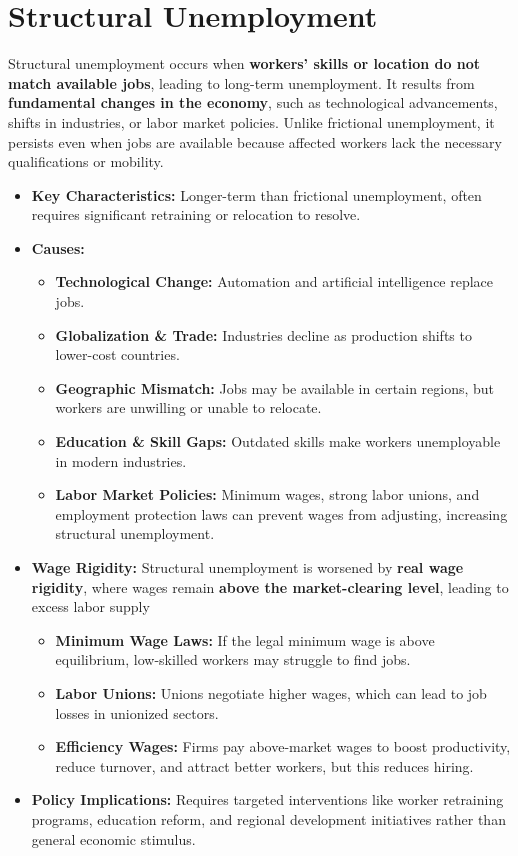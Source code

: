 \documentclass[a4paper, 11pt]{article}
\begin{document}
\section{Structural Unemployment}
Structural unemployment occurs when \textbf{workers’ skills or location do not match available jobs}, leading to long-term unemployment. It results from \textbf{fundamental changes in the economy}, such as technological advancements, shifts in industries, or labor market policies. Unlike frictional unemployment, it persists even when jobs are available because affected workers lack the necessary qualifications or mobility.
\begin{itemize}
    \item \textbf{Key Characteristics:} Longer-term than frictional unemployment, often requires significant retraining or relocation to resolve.
    \item \textbf{Causes:}
    \begin{itemize}
        \item \textbf{Technological Change:} Automation and artificial intelligence replace jobs.
        \item \textbf{Globalization \& Trade:} Industries decline as production shifts to lower-cost countries.
        \item \textbf{Geographic Mismatch:} Jobs may be available in certain regions, but workers are unwilling or unable to relocate.
        \item \textbf{Education \& Skill Gaps:} Outdated skills make workers unemployable in modern industries.
        \item \textbf{Labor Market Policies:} Minimum wages, strong labor unions, and employment protection laws can prevent wages from adjusting, increasing structural unemployment.
    \end{itemize}
    \item \textbf{Wage Rigidity:} Structural unemployment is worsened by \textbf{real wage rigidity}, where wages remain \textbf{above the market-clearing level}, leading to excess labor supply
    \begin{itemize}
        \item \textbf{Minimum Wage Laws:} If the legal minimum wage is above equilibrium, low-skilled workers may struggle to find jobs.
        \item \textbf{Labor Unions:} Unions negotiate higher wages, which can lead to job losses in unionized sectors.
        \item \textbf{Efficiency Wages:} Firms pay above-market wages to boost productivity, reduce turnover, and attract better workers, but this reduces hiring.
    \end{itemize}
    \item \textbf{Policy Implications:} Requires targeted interventions like worker retraining programs, education reform, and regional development initiatives rather than general economic stimulus.
\end{itemize}
\end{document}
